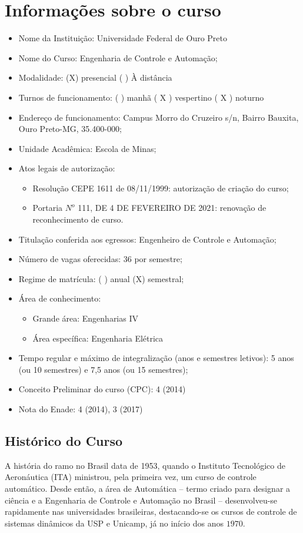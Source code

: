\documentclass[
	12pt,				%
	openright,			%
	oneside,			%
	a4paper,			%
	english,			%
	brazil				%
	]{abntex2}
\begin{document}
\chapter{Informações sobre o curso}
%
\begin{itemize}
    \item[] Nome da Instituição: Universidade Federal de Ouro Preto
	\item[] Nome do Curso: Engenharia de Controle e Automação;
	\item[] Modalidade: (X) presencial ( ) À distância
	\item[] Turnos de funcionamento: ( ) manhã ( X ) vespertino ( X ) noturno
	\item[] Endereço de funcionamento: Campus Morro do Cruzeiro s/n, Bairro Bauxita, Ouro  Preto-MG, 35.400-000;
	\item[] Unidade Acadêmica: Escola de Minas;
	\item[] Atos legais de autorização:
	\begin{itemize}
	    \item Resolução CEPE 1611 de 08/11/1999: autorização de criação do curso;
	    \item Portaria $N^{o}$ 111, DE 4 DE FEVEREIRO DE 2021: renovação de reconhecimento de curso.
	\end{itemize}
	\item[] Titulação conferida aos egressos: Engenheiro de Controle e Automação;
	\item[] Número de vagas oferecidas: 36 por semestre;
	\item[] Regime de matrícula: ( ) anual (X) semestral;
	\item[] Área de conhecimento:
	\begin{itemize}
	    \item Grande área: Engenharias IV
	    \item Área específica: Engenharia Elétrica
	\end{itemize}
	\item[] Tempo regular e máximo de  integralização (anos e
	semestres letivos): 5 anos (ou 10 semestres) e 7,5 anos (ou 15 semestres);
	\item[] Conceito Preliminar do curso  (CPC): 4 (2014)
	\item[] Nota do Enade: 4 (2014), 3 (2017)
\end{itemize}

\section{Histórico do Curso}
%
A história do ramo no Brasil data de 1953, quando o Instituto Tecnológico de Aeronáutica (ITA) ministrou, pela primeira vez, um curso de controle automático. Desde então, a área de Automática -- termo criado para designar a ciência e a Engenharia de Controle e Automação no Brasil -- desenvolveu-se rapidamente nas universidades brasileiras, destacando-se os cursos de controle de sistemas dinâmicos da USP e Unicamp, já no início dos anos $1970$.
\end{document}
